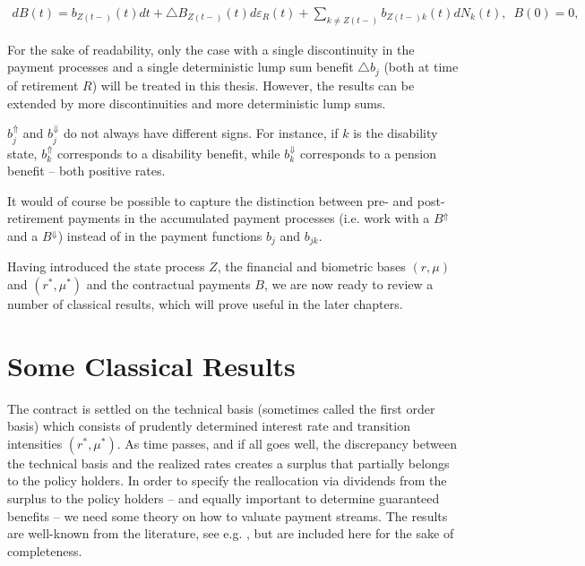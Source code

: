 \documentclass{book}
\newcommand{\1}[1]{\mathbbm{1}_{\left\lbrace #1 \right\rbrace}}
\theoremstyle{break}
\theoremstyle{remark}
\newenvironment{remark}
  {\pushQED{\qed}\renewcommand{\qedsymbol}{\scalebox{1.4}{$\circ$}}\remarkx}
  {\popQED\endremarkx}
\numberwithin{equation}{section}
\begin{document}
\begin{align}
    dB(t) = b_{Z(t-)}(t)dt + \triangle B_{Z(t-)}(t) d \varepsilon_{R}(t) + \sum_{k \neq Z(t-)}b_{{Z(t-)}k}(t)dN_{k}(t), \, \, \, B(0) = 0, \label{PaymentProcessDef}
\end{align}

\begin{remark}
	For the sake of readability, only the case with a single discontinuity in the payment processes and a single deterministic lump sum benefit $\triangle b_j$ (both at time of retirement $R$) will be treated in this thesis. However, the results can be extended by more discontinuities and more deterministic lump sums.
\end{remark}

\begin{remark}
	$b_j^{\Uparrow}$ and $b_j^{\Downarrow}$ do not always have different signs. For instance, if $k$ is the disability state, $b_k^{\Uparrow}$ corresponds to a disability benefit, while $b_k^{\Downarrow}$ corresponds to a pension benefit -- both positive rates.
\end{remark}

\begin{remark}
	It would of course be possible to capture the distinction between pre- and post-retirement payments in the accumulated payment processes (i.e. work with a $B^{\Uparrow}$ and a $B^{\Downarrow}$) instead of in the payment functions $b_j$ and $b_{jk}$.
\end{remark}

Having introduced the state process $Z$, the financial and biometric bases $(r,\mu)$ and $(r^*,\mu^*)$ and the contractual payments $B$, we are now ready to review a number of classical results, which will prove useful in the later chapters.

\section{Some Classical Results}

The contract is settled on the technical basis (sometimes called the first order basis) which consists of prudently determined interest rate and transition intensities $(r^*,\mu^*)$. As time passes, and if all goes well, the discrepancy between the technical basis and the realized rates creates a surplus that partially belongs to the policy holders. In order to specify the reallocation via dividends from the surplus to the policy holders -- and equally important to determine guaranteed benefits -- we need some theory on how to valuate payment streams. The results are well-known from the literature, see e.g. \cite{Norberg1991}, but are included here for the sake of completeness.
\end{document}
